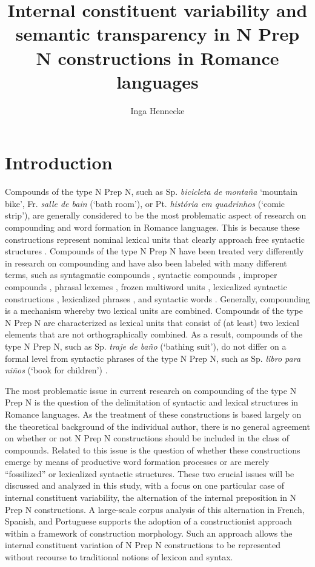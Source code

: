 \documentclass[output=paper]{langsci/langscibook}
\title{Internal constituent variability and semantic transparency in N Prep N constructions in Romance languages}
\author{Inga Hennecke\affiliation{University of Tübingen}}
\begin{document}
\maketitle
\section{Introduction} 
Compounds of the type N Prep N, such as Sp. \textit{bicicleta de montaña} `mountain bike', Fr. \textit{salle de bain} (`bath room'), or Pt. \textit{história em quadrinhos} (`comic strip'), are generally considered to be the most problematic aspect of research on compounding and word formation in Romance languages. This is because these constructions represent nominal lexical units that clearly approach free syntactic structures \citep{BustosGisbert:1986}. Compounds of the type N Prep N have been treated very differently in research on compounding and have also been labeled with many different terms, such as syntagmatic compounds \citep{BuenafuentesdelaMata:2010}, syntactic compounds \citep{RioTorto:2009}, improper compounds \citep{Kornfeld:2009}, phrasal lexemes \citep{Masini:2007}, frozen multiword units \citep{Guevara:2012}, lexicalized syntactic constructions \citep{Villoing:2012}, lexicalized phrases \citep{Fradin:2009}, and syntactic words \citep{DiSciullo:1987}. Generally, compounding is a mechanism whereby two lexical units are combined. Compounds of the type N Prep N are characterized as lexical units that consist of (at least) two lexical elements that are not orthographically combined. As a result, compounds of the type N Prep N, such as Sp. \textit{traje de baño} (`bathing suit'), do not differ on a formal level from syntactic phrases of the type N Prep N, such as Sp. \textit{libro para niños} (`book for children') \citep[69]{BustosGisbert:1986}.

The most problematic issue in current research on compounding of the type N Prep N is the question of the delimitation of syntactic and lexical structures in Romance languages. As the treatment of these constructions is based largely on the theoretical background of the individual author, there is no general agreement on whether or not N Prep N constructions should be included in the class of compounds. Related to this issue is the question of whether these constructions emerge by means of productive word formation processes or are merely ``fossilized'' or lexicalized syntactic structures. These two crucial issues will be discussed and analyzed in this study, with a focus on one particular case of internal constituent variability, the alternation of the internal preposition in N Prep N constructions. A large-scale corpus analysis of this alternation in French, Spanish, and Portuguese supports the adoption of a constructionist approach within a framework of construction morphology. Such an approach allows the internal constituent variation of N Prep N constructions to be represented without recourse to traditional notions of lexicon and syntax.
\end{document}
